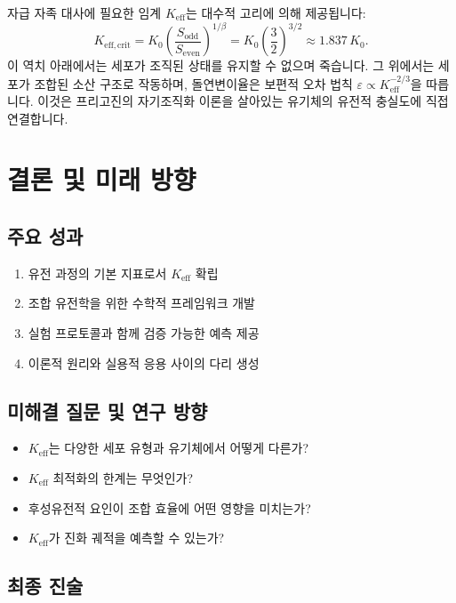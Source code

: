 \documentclass[11pt,a4paper]{article}
\newcommand{\Keff}{K_{\mathrm{eff}}}
\newcommand{\Sodd}{S_{\mathrm{odd}}}
\newcommand{\Seven}{S_{\mathrm{even}}}
\begin{document}
	자급 자족 대사에 필요한 임계 \(\Keff\)는 대수적 고리에 의해 제공됩니다:
	\begin{equation}
		K_{\mathrm{eff},\mathrm{crit}} = K_0 \left( \frac{\Sodd}{\Seven} \right)^{1/\beta}
		= K_0 \left( \frac{3}{2} \right)^{3/2} \approx 1.837\,K_0 .
	\end{equation}
	이 역치 아래에서는 세포가 조직된 상태를 유지할 수 없으며 죽습니다. 그 위에서는 세포가 조합된 소산 구조로 작동하며, 돌연변이율은 보편적 오차 법칙 \(\varepsilon \propto \Keff^{-2/3}\)을 따릅니다. 이것은 프리고진의 자기조직화 이론을 살아있는 유기체의 유전적 충실도에 직접 연결합니다.
	
	\section{결론 및 미래 방향}
	
	\subsection{주요 성과}
	
	\begin{enumerate}
		\item 유전 과정의 기본 지표로서 \(K_{\text{eff}}\) 확립
		\item 조합 유전학을 위한 수학적 프레임워크 개발
		\item 실험 프로토콜과 함께 검증 가능한 예측 제공
		\item 이론적 원리와 실용적 응용 사이의 다리 생성
	\end{enumerate}
	
	\subsection{미해결 질문 및 연구 방향}
	
	\begin{itemize}
		\item \(K_{\text{eff}}\)는 다양한 세포 유형과 유기체에서 어떻게 다른가?
		\item \(K_{\text{eff}}\) 최적화의 한계는 무엇인가?
		\item 후성유전적 요인이 조합 효율에 어떤 영향을 미치는가?
		\item \(K_{\text{eff}}\)가 진화 궤적을 예측할 수 있는가?
	\end{itemize}
	
	\subsection{최종 진술}
	
\end{document}
